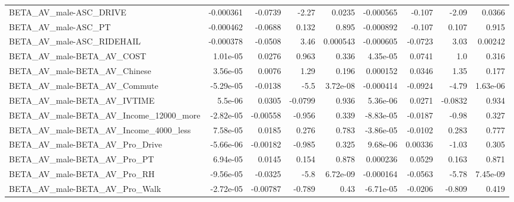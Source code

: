 \begin{tabular}{lrrrrrrrr}
BETA\_AV\_male-ASC\_DRIVE                             &   -0.000361 &      -0.0739 &     -2.27 &   0.0235 &  -0.000565 &      -0.107 &        -2.09 &        0.0366 \\
BETA\_AV\_male-ASC\_PT                                &   -0.000462 &      -0.0688 &     0.132 &    0.895 &  -0.000892 &      -0.107 &        0.107 &         0.915 \\
BETA\_AV\_male-ASC\_RIDEHAIL                          &   -0.000378 &      -0.0508 &      3.46 & 0.000543 &  -0.000605 &     -0.0723 &         3.03 &       0.00242 \\
BETA\_AV\_male-BETA\_AV\_COST                          &    1.01e-05 &       0.0276 &     0.963 &    0.336 &   4.35e-05 &      0.0741 &          1.0 &         0.316 \\
BETA\_AV\_male-BETA\_AV\_Chinese                       &    3.56e-05 &       0.0076 &      1.29 &    0.196 &   0.000152 &      0.0346 &         1.35 &         0.177 \\
BETA\_AV\_male-BETA\_AV\_Commute                       &   -5.29e-05 &      -0.0138 &      -5.5 & 3.72e-08 &  -0.000414 &     -0.0924 &        -4.79 &      1.63e-06 \\
BETA\_AV\_male-BETA\_AV\_IVTIME                        &     5.5e-06 &       0.0305 &   -0.0799 &    0.936 &   5.36e-06 &      0.0271 &      -0.0832 &         0.934 \\
BETA\_AV\_male-BETA\_AV\_Income\_12000\_more             &   -2.82e-05 &     -0.00558 &    -0.956 &    0.339 &  -8.83e-05 &     -0.0187 &        -0.98 &         0.327 \\
BETA\_AV\_male-BETA\_AV\_Income\_4000\_less              &    7.58e-05 &       0.0185 &     0.276 &    0.783 &  -3.86e-05 &     -0.0102 &        0.283 &         0.777 \\
BETA\_AV\_male-BETA\_AV\_Pro\_Drive                     &   -5.66e-06 &     -0.00182 &    -0.985 &    0.325 &   9.68e-06 &     0.00336 &        -1.03 &         0.305 \\
BETA\_AV\_male-BETA\_AV\_Pro\_PT                        &    6.94e-05 &       0.0145 &     0.154 &    0.878 &   0.000236 &      0.0529 &        0.163 &         0.871 \\
BETA\_AV\_male-BETA\_AV\_Pro\_RH                        &   -9.56e-05 &      -0.0325 &      -5.8 & 6.72e-09 &  -0.000164 &     -0.0563 &        -5.78 &      7.45e-09 \\
BETA\_AV\_male-BETA\_AV\_Pro\_Walk                      &   -2.72e-05 &     -0.00787 &    -0.789 &     0.43 &  -6.71e-05 &     -0.0206 &       -0.809 &         0.419 \\

\end{tabular}
